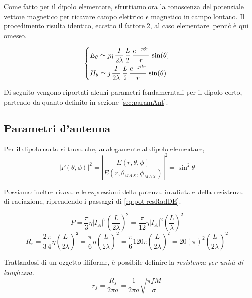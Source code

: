\bigbreak
Come fatto per il dipolo elementare, sfruttiamo ora la conoscenza del potenziale vettore magnetico per ricavare campo elettrico e magnetico in campo lontano.
Il procedimento risulta identico, eccetto il fattore 2, al caso elementare, perciò è qui omesso.

\begin{equation}\begin{dcases}
	E_\theta
	\simeq \jmath \eta\,\frac{I}{2\lambda}\, \frac{L}{2} \, \frac{e^{-\jmath \beta r}}{r} \, \sin(\theta) \\
	H_\theta
	\simeq \jmath \,\frac{I}{2\lambda}\, \frac{L}{2} \, \frac{e^{-\jmath \beta r}}{r} \, \sin(\theta) \\
\end{dcases}\end{equation}

Di seguito vengono riportati alcuni parametri fondamerntali per il dipolo corto, partendo da quanto definito in sezione \ref{sec:paramAnt}.

\subsection{Parametri d'antenna}

Per il dipolo corto si trova che, analogamente al dipolo elementare,
\begin{equation}
\left | F(\theta, \phi) \right |^2 = \left | \frac{E(r, \theta, \phi)}{E(r, \theta_{MAX}, \phi_{MAX})} \right |^2 = \sin^2\theta
\end{equation}

Possiamo inoltre ricavare le espressioni della potenza irradiata e della resistenza di radiazione, riprendendo i passaggi di \autoref{eq:pot-resRadDE}.

\begin{equation*}
P = \frac{\pi}{3} \eta \left | I_A \right |^2 \left(\frac{L}{2 \lambda}\right)^2 = \frac{\pi}{12} \eta \left | I_A \right |^2 \left(\frac{L}{\lambda}\right)^2
\end{equation*}
\begin{equation*}
R_r = \frac{2}{3} \frac{\pi}{4} \eta \left(\frac{L}{2 \lambda}\right)^2 = \frac{\pi}{6} \eta \left(\frac{L}{2 \lambda}\right)^2 = \frac{\pi}{6} 120 \pi	 \left(\frac{L}{2 \lambda}\right)^2 = 20 (\pi)^2 \left(\frac{L}{2 \lambda}\right)^2
\end{equation*}

Trattandosi di un oggetto filiforme, è possibile definire la \emph{resistenza per unità di lunghezza}.
\begin{equation*}
			r_f = \frac{R_s}{2 \pi a} = \frac{1}{2 \pi a} \sqrt{\frac{\pi f M }{\sigma}}
		\end{equation*}

